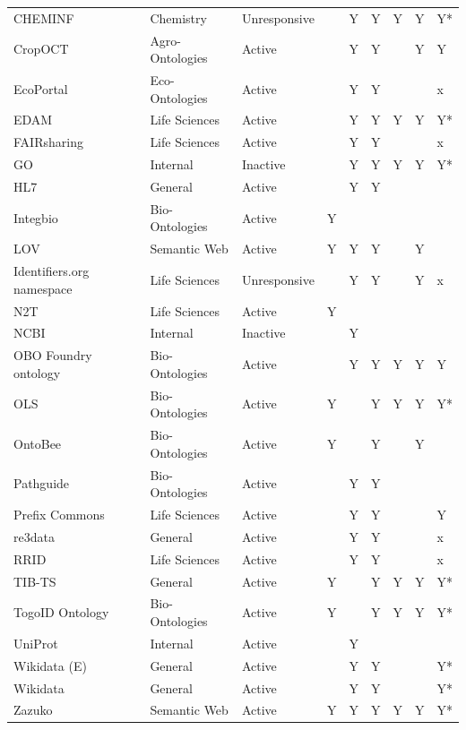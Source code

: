 \begin{table}
\begin{tabular}{lllllllll}
CHEMINF~\cite{Hastings2011} & Chemistry & Unresponsive &  & Y & Y & Y & Y & Y* \\
CropOCT~\cite{Arnaud2020} & Agro-Ontologies & Active &  & Y & Y &  & Y & Y \\
EcoPortal~\cite{Kechagioglou2021} & Eco-Ontologies & Active &  & Y & Y &  &  & x \\
EDAM~\cite{Ison2013} & Life Sciences & Active &  & Y & Y & Y & Y & Y* \\
FAIRsharing~\cite{Sansone2019} & Life Sciences & Active &  & Y & Y &  &  & x \\
GO~\cite{TheGeneOntologyConsortium2019} & Internal & Inactive &  & Y & Y & Y & Y & Y* \\
HL7~\cite{Bender2013} & General & Active &  & Y & Y &  &  &  \\
Integbio & Bio-Ontologies & Active & Y &  &  &  &  &  \\
LOV & Semantic Web & Active & Y & Y & Y &  & Y &  \\
Identifiers.org namespace~\cite{Juty2012} & Life Sciences & Unresponsive &  & Y & Y &  & Y & x \\
N2T~\cite{Wimalaratne2018} & Life Sciences & Active & Y &  &  &  &  &  \\
NCBI~\cite{Clark2016} & Internal & Inactive &  & Y &  &  &  &  \\
OBO Foundry ontology~\cite{Jackson2021} & Bio-Ontologies & Active &  & Y & Y & Y & Y & Y \\
OLS~\cite{Cote2006a} & Bio-Ontologies & Active & Y &  & Y & Y & Y & Y* \\
OntoBee~\cite{Ong2017} & Bio-Ontologies & Active & Y &  & Y &  & Y &  \\
Pathguide & Bio-Ontologies & Active &  & Y & Y &  &  &  \\
Prefix Commons~\cite{prefixcommons} & Life Sciences & Active &  & Y & Y &  &  & Y \\
re3data~\cite{Pampel2013} & General & Active &  & Y & Y &  &  & x \\
RRID & Life Sciences & Active &  & Y & Y &  &  & x \\
TIB-TS & General & Active & Y &  & Y & Y & Y & Y* \\
TogoID Ontology & Bio-Ontologies & Active & Y &  & Y & Y & Y & Y* \\
UniProt~\cite{Bateman2021} & Internal & Active &  & Y &  &  &  &  \\
Wikidata (E)~\cite{Waagmeester2020} & General & Active &  & Y & Y &  &  & Y* \\
Wikidata~\cite{Waagmeester2020} & General & Active &  & Y & Y &  &  & Y* \\
Zazuko & Semantic Web & Active & Y & Y & Y & Y & Y & Y* \\
\bottomrule
\end{tabular}
\end{table}
